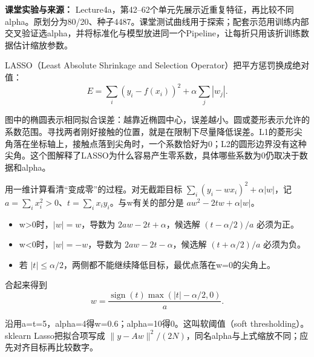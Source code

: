 \textbf{课堂实验与来源：} Lecture4a，第42–62个单元先展示近重复特征，再比较不同alpha。原划分为80/20、种子4487。课堂测试曲线用于探索；配套示范用训练内部交叉验证选alpha，并将标准化与模型放进同一个Pipeline，让每折只用该折训练数据估计缩放参数。








LASSO（Least Absolute Shrinkage and Selection Operator）把平方惩罚换成绝对值：
\[
E=\sum_i(y_i-f(x_i))^2+\alpha\sum_j|w_j|.\tag{4.12}
\]


图中的椭圆表示相同拟合误差：越靠近椭圆中心，误差越小。圆或菱形表示允许的系数范围。寻找两者刚好接触的位置，就是在限制下尽量降低误差。L1的菱形尖角落在坐标轴上，接触点落到尖角时，一个系数恰好为0；L2的圆形边界没有这种尖角。这个图解释了LASSO为什么容易产生零系数，具体哪些系数为0仍取决于数据和alpha。


\begingroup\renewcommand{\StudyImageWidth}{.72\linewidth}
\endgroup
{}


\begingroup\renewcommand{\StudyImageWidth}{.72\linewidth}
\endgroup
{}


用一维计算看清“变成零”的过程。对无截距目标 \(\sum_i(y_i-wx_i)^2+\alpha|w|\)，记 \(a=\sum_i x_i^2>0\)、\(t=\sum_i x_i y_i\)。与w有关的部分是 \(aw^2-2tw+\alpha|w|\)。



\begin{itemize}

\item w>0时，\(|w|=w\)，导数为 \(2aw-2t+\alpha\)，候选解 \((t-\alpha/2)/a\) 必须为正。

\item w<0时，\(|w|=-w\)，导数为 \(2aw-2t-\alpha\)，候选解 \((t+\alpha/2)/a\) 必须为负。

\item 若 \(|t|\le\alpha/2\)，两侧都不能继续降低目标，最优点落在w=0的尖角上。

\end{itemize}


合起来得到
\[
w=\frac{\operatorname{sign}(t)\max(|t|-\alpha/2,0)}a.\tag{4.13}
\]


沿用a=t=5，alpha=4得w=0.6；alpha=10得0。这叫软阈值（soft thresholding）。sklearn Lasso把拟合项写成 \(\|y-Aw\|^2/(2N)\)，同名alpha与上式缩放不同；应先对齐目标再比较数字。



